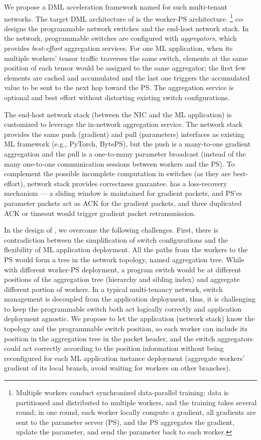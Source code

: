 We propose a DML acceleration framework named \sysname for such multi-tenant networks. The target DML architecture of \sysname is the worker-PS architecture. \footnote{Multiple workers conduct synchronized data-parallel training: data is partitioned and distributed to multiple workers, and the training takes several round; in one round, each worker locally compute a gradient, all gradients are sent to the parameter server (PS), and the PS aggregates the gradient, update the parameter, and send the parameter back to each worker.} \sysname co-designs the programmable network switches and the end-host network stack. In the network, programmable switches are configured with \emph{aggregators}, which provides \emph{best-effort} aggregation services. For one ML application, when its multiple workers' tensor traffic traverses the same switch, elements at the same position of each tensor would be assigned to the same aggregator; the first few elements are cached and accumulated and the last one triggers the accumulated value to be sent to the next hop toward the PS. The aggregation service is optional and best effort without distorting existing switch configurations.

The end-host network stack (between the NIC and the ML application) is customized to leverage the in-network aggregation service. The \sysname network stack provides the same push (gradient) and pull (parameters) interfaces as existing ML framework (e.g., PyTorch, BytePS), but the push is a many-to-one gradient aggregation and the pull is a one-to-many parameter broadcast (instead of the many one-to-one communication sessions between workers and the PS). To complement the possible incomplete computation in switches (as they are best-effort), \sysname network stack provides correctness guarantee. \sysname has a loss-recovery mechanism --- a sliding window is maintained for gradient packets, and PS'es parameter packets act as ACK for the gradient packets, and three duplicated ACK or timeout would trigger gradient packet retransmission. 


In the design of \sysname, we overcome the following challenges. First, there is contradiction between the simplification of switch configurations and the flexibility of ML application deployment. All the paths from the workers to the PS would form a tree in the network topology, named aggregation tree. While with different worker-PS deployment, a program switch would be at different positions of the aggregation tree (hierarchy and sibling index) and aggregate different portion of workers. In a typical multi-tenancy network, switch management is decoupled from the application deployment, thus, it is challenging to keep the programmable switch both act logically correctly and application deployment agnostic. We propose to let the application (\sysname network stack) know the topology and the programmable switch position, so each worker can include its position in the aggregation tree in the packet header, and the switch aggregators could act correctly according to the position information without being reconfigured for each ML application instance deployment (aggregate workers' gradient of its local branch, avoid waiting for workers on other branches).


